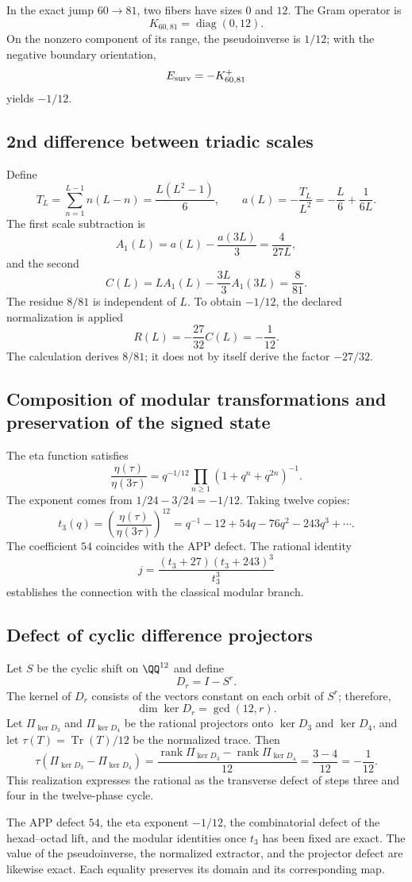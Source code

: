In the exact jump \(60\to81\), two fibers have sizes \(0\) and
\(12\). The Gram operator is
\[
K_{60,81}=\operatorname{diag}(0,12).
\]
On the nonzero component of its range, the pseudoinverse is \(1/12\); with the negative
boundary orientation,
\[
E_{\rm surv}=-K_{60,81}^{+}
\]
yields \(-1/12\).

\subsection{2nd difference between triadic scales}
\label{sec:c12-segunda-diferencia-triadica}

Define
\[
T_L=\sum_{n=1}^{L-1}n(L-n)=\frac{L(L^2-1)}6,
\qquad
a(L)=-\frac{T_L}{L^2}=-\frac L6+\frac1{6L}.
\]
The first scale subtraction is
\[
A_1(L)=a(L)-\frac{a(3L)}3=\frac4{27L},
\]
and the second
\[
C(L)=LA_1(L)-\frac{3L}{3}A_1(3L)=\frac8{81}.
\]
The residue \(8/81\) is independent of \(L\). To obtain
\(-1/12\), the declared normalization is applied
\[
R(L)=-\frac{27}{32}C(L)=-\frac1{12}.
\]
The calculation derives \(8/81\); it does not by itself derive the factor \(-27/32\).

\subsection{Composition of modular transformations and preservation of the signed state}

The eta function satisfies
\[
\frac{\eta(\tau)}{\eta(3\tau)}
=q^{-1/12}\prod_{n\ge1}(1+q^n+q^{2n})^{-1}.
\]
The exponent comes from \(1/24-3/24=-1/12\). Taking twelve copies:
\[
t_3(q)=\left(\frac{\eta(\tau)}{\eta(3\tau)}\right)^{12}
=q^{-1}-12+54q-76q^2-243q^3+\cdots.
\]
The coefficient \(54\) coincides with the APP defect\@. The rational identity
\[
j=\frac{(t_3+27)(t_3+243)^3}{t_3^3}
\]
establishes the connection with the classical modular branch.

\subsection{Defect of cyclic difference projectors}

Let \(S\) be the cyclic shift on \(\QQ^{12}\) and define
\[
 D_r=I-S^r.
\]
The kernel of \(D_r\) consists of the vectors constant on each orbit
of \(S^r\); therefore,
\[
 \dim\ker D_r=\gcd(12,r).
\]
Let \(\Pi_{\ker D_3}\) and \(\Pi_{\ker D_4}\) be the rational projectors onto
\(\ker D_3\) and \(\ker D_4\), and let
\(\tau(T)=\operatorname{Tr}(T)/12\) be the normalized trace. Then
\[
 \boxed{
 \tau(\Pi_{\ker D_3}-\Pi_{\ker D_4})
 =\frac{\operatorname{rank}\Pi_{\ker D_3}
       -\operatorname{rank}\Pi_{\ker D_4}}{12}
 =\frac{3-4}{12}
 =-\frac1{12}.}
\]
This realization expresses the rational as the transverse defect of steps
three and four in the twelve-phase cycle.

\begin{remark}
The APP defect \(54\), the eta exponent \(-1/12\), the combinatorial
defect of the hexad--octad lift, and the
modular identities once \(t_3\) has been fixed are exact. The value
of the pseudoinverse, the normalized extractor, and the projector defect are likewise exact.
Each equality preserves its domain and its corresponding map.
\end{remark}
